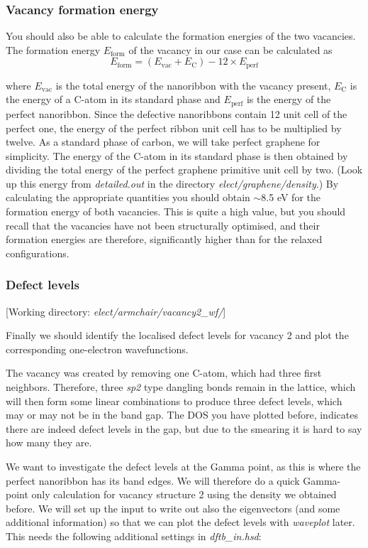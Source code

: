 \documentclass[a4paper,11pt,english]{sphinxmanual}
\begin{document}
{{\subsubsection{Vacancy formation energy}
\label{electstruct:vacancy-formation-energy}
You should also be able to calculate the formation energies of the two
vacancies. The formation energy \(E_{\text{form}}\) of the vacancy
in our case can be calculated as
$$
E_{\text{form}} = \left( E_{\text{vac}} + E_{\text{C}} \right)
- 12 \times E_{\text{perf}}
$$

where \(E_{\text{vac}}\) is the total energy of the nanoribbon
with the vacancy present, \(E_{\text{C}}\) is the energy of a
C-atom in its standard phase and \(E_{\text{perf}}\) is the energy
of the perfect nanoribbon. Since the defective nanoribbons contain 12
unit cell of the perfect one, the energy of the perfect ribbon unit
cell has to be multiplied by twelve. As a standard phase of carbon, we
will take perfect graphene for simplicity. The energy of the C-atom in
its standard phase is then obtained by dividing the total energy of
the perfect graphene primitive unit cell by two. (Look up this energy
from \emph{detailed.out} in the directory \emph{elect/graphene/density}.)  By
calculating the appropriate quantities you should obtain $\sim$8.5 eV for
the formation energy of both vacancies. This is quite a high value,
but you should recall that the vacancies have not been structurally
optimised, and their formation energies are therefore, significantly
higher than for the relaxed configurations.


\subsubsection{Defect levels}
\label{electstruct:defect-levels}
{[}Working directory: \emph{elect/armchair/vacancy2\_wf/}{]}

Finally we should identify the localised defect levels for vacancy 2
and plot the corresponding one-electron wavefunctions.

The vacancy was created by removing one C-atom, which had three first
neighbors. Therefore, three \emph{sp2} type dangling bonds remain in the
lattice, which will then form some linear combinations to produce
three defect levels, which may or may not be in the band gap. The DOS
you have plotted before, indicates there are indeed defect levels in
the gap, but due to the smearing it is hard to say how many they are.

We want to investigate the defect levels at the Gamma point, as this
is where the perfect nanoribbon has its band edges. We will therefore
do a quick Gamma-point only calculation for vacancy structure 2 using
the density we obtained before. We will set up the input to write out
also the eigenvectors (and some additional information) so that we can
plot the defect levels with \emph{waveplot} later. This needs the following
additional settings in \emph{dftb\_in.hsd}:

}}
\end{document}
